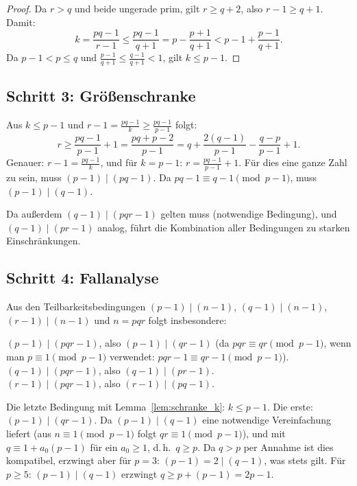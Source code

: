 \documentclass[12pt,a4paper]{amsart}
\theoremstyle{definition}
\begin{document}
\begin{proof}
Da $r > q$ und beide ungerade prim, gilt $r \ge q + 2$, also $r - 1 \ge q + 1$.
Damit:
\[
  k = \frac{pq - 1}{r - 1} \le \frac{pq - 1}{q + 1} = p - \frac{p+1}{q+1} < p - 1 + \frac{p-1}{q+1}.
\]
Da $p - 1 < p \le q$ und $\tfrac{p-1}{q+1} \le \tfrac{q-1}{q+1} < 1$, gilt $k \le p - 1$.
\end{proof}

\subsection{Schritt 3: Größenschranke}

Aus $k \le p - 1$ und $r - 1 = \tfrac{pq-1}{k} \ge \tfrac{pq-1}{p-1}$ folgt:
\[
  r \ge \frac{pq - 1}{p - 1} + 1 = \frac{pq + p - 2}{p-1} = q + \frac{2(q-1)}{p-1} - \frac{q-p}{p-1} + 1.
\]
Genauer: $r - 1 = \tfrac{pq-1}{k}$, und für $k = p - 1$:
$r = \tfrac{pq-1}{p-1} + 1$. Für dies eine ganze Zahl zu sein, muss
$(p-1) \mid (pq - 1)$. Da $pq - 1 \equiv q - 1 \pmod{p-1}$, muss $(p-1) \mid (q-1)$.

\medskip
Da außerdem $(q-1) \mid (pqr - 1)$ gelten muss (notwendige Bedingung), und
$(q-1) \mid (pr - 1)$ analog, führt die Kombination aller Bedingungen zu
starken Einschränkungen.

\subsection{Schritt 4: Fallanalyse}

Aus den Teilbarkeitsbedingungen $(p-1) \mid (n-1)$, $(q-1) \mid (n-1)$, $(r-1) \mid (n-1)$
und $n = pqr$ folgt insbesondere:

\noindent$(p-1) \mid (pqr - 1)$, also $(p-1) \mid (qr - 1)$
(da $pqr \equiv qr \pmod{p-1}$, wenn man $p \equiv 1 \pmod{p-1}$ verwendet:
$pqr - 1 \equiv qr - 1 \pmod{p-1}$). \\
$(q-1) \mid (pqr - 1)$, also $(q-1) \mid (pr - 1)$. \\
$(r-1) \mid (pqr - 1)$, also $(r-1) \mid (pq - 1)$.

\medskip
\noindent Die letzte Bedingung mit Lemma~\ref{lem:schranke_k}: $k \le p - 1$.
Die erste: $(p-1) \mid (qr - 1)$. Da $(p-1) \mid (q-1)$ eine notwendige Vereinfachung
liefert (aus $n \equiv 1 \pmod{p-1}$ folgt $qr \equiv 1 \pmod{p-1}$), und mit
$q \equiv 1 + a_0(p-1)$ für ein $a_0 \ge 1$, d.\,h.\ $q \ge p$. Da $q > p$ per
Annahme ist dies kompatibel, erzwingt aber für $p = 3$:
$(p-1) = 2 \mid (q-1)$, was stets gilt. Für $p \ge 5$: $(p-1) \mid (q-1)$ erzwingt
$q \ge p + (p-1) = 2p - 1$.
\end{document}
